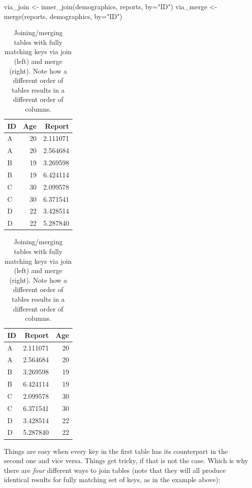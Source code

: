 \documentclass[
]{book}
\newenvironment{Shaded}{\begin{snugshade}}{\end{snugshade}}
\newcommand{\AttributeTok}[1]{\textcolor[rgb]{0.77,0.63,0.00}{#1}}
\newcommand{\FunctionTok}[1]{\textcolor[rgb]{0.00,0.00,0.00}{#1}}
\newcommand{\NormalTok}[1]{#1}
\newcommand{\OtherTok}[1]{\textcolor[rgb]{0.56,0.35,0.01}{#1}}
\newcommand{\StringTok}[1]{\textcolor[rgb]{0.31,0.60,0.02}{#1}}
\begin{document}
\begin{Shaded}
\begin{Highlighting}[]
\NormalTok{via\_join }\OtherTok{\textless{}{-}} \FunctionTok{inner\_join}\NormalTok{(demographics, reports, }\AttributeTok{by=}\StringTok{"ID"}\NormalTok{)}
\NormalTok{via\_merge }\OtherTok{\textless{}{-}} \FunctionTok{merge}\NormalTok{(reports, demographics, }\AttributeTok{by=}\StringTok{"ID"}\NormalTok{)}
\end{Highlighting}
\end{Shaded}

\begin{table}
\caption{\label{tab:unnamed-chunk-177}Joining/merging tables with fully matching keys via join (left) and merge (right). Note how a different order of tables results in a different order of columns.}

\centering
\begin{tabular}[t]{l|r|r}
\hline
ID & Age & Report\\
\hline
A & 20 & 2.111071\\
\hline
A & 20 & 2.564684\\
\hline
B & 19 & 3.269598\\
\hline
B & 19 & 6.424114\\
\hline
C & 30 & 2.099578\\
\hline
C & 30 & 6.371541\\
\hline
D & 22 & 3.428514\\
\hline
D & 22 & 5.287840\\
\hline
\end{tabular}
\centering
\begin{tabular}[t]{l|r|r}
\hline
ID & Report & Age\\
\hline
A & 2.111071 & 20\\
\hline
A & 2.564684 & 20\\
\hline
B & 3.269598 & 19\\
\hline
B & 6.424114 & 19\\
\hline
C & 2.099578 & 30\\
\hline
C & 6.371541 & 30\\
\hline
D & 3.428514 & 22\\
\hline
D & 5.287840 & 22\\
\hline
\end{tabular}
\end{table}

Things are easy when every key in the first table has its counterpart in the second one and vice versa. Things get tricky, if that is not the case. Which is why there are \emph{four} different ways to join tables (note that they will all produce identical results for fully matching set of keys, as in the example above):
\end{document}
